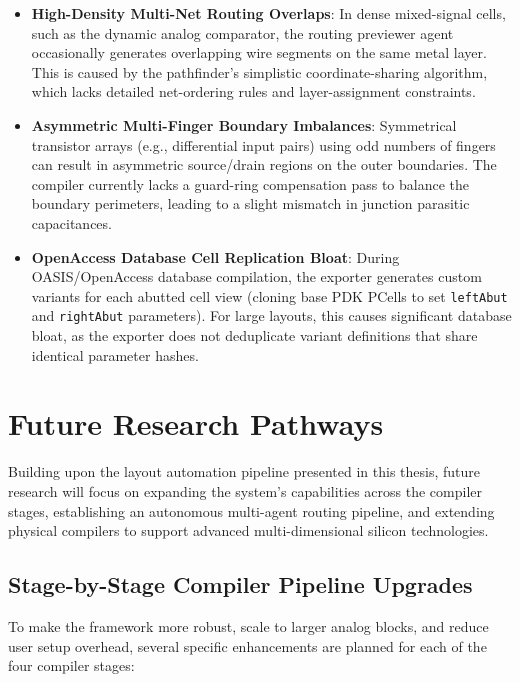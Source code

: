 \begin{itemize}
    \item \textbf{High-Density Multi-Net Routing Overlaps}: In dense mixed-signal cells, such as the dynamic analog comparator, the routing previewer agent occasionally generates overlapping wire segments on the same metal layer. This is caused by the pathfinder's simplistic coordinate-sharing algorithm, which lacks detailed net-ordering rules and layer-assignment constraints.
    \item \textbf{Asymmetric Multi-Finger Boundary Imbalances}: Symmetrical transistor arrays (e.g., differential input pairs) using odd numbers of fingers can result in asymmetric source/drain regions on the outer boundaries. The compiler currently lacks a guard-ring compensation pass to balance the boundary perimeters, leading to a slight mismatch in junction parasitic capacitances.
    \item \textbf{OpenAccess Database Cell Replication Bloat}: During OASIS/OpenAccess database compilation, the exporter generates custom variants for each abutted cell view (cloning base PDK PCells to set \texttt{leftAbut} and \texttt{rightAbut} parameters). For large layouts, this causes significant database bloat, as the exporter does not deduplicate variant definitions that share identical parameter hashes.
\end{itemize}

\section[Future Work]{Future Research Pathways}
\label{sec:future_work}

\noindent
Building upon the layout automation pipeline presented in this thesis, future research will focus on expanding the system's capabilities across the compiler stages, establishing an autonomous multi-agent routing pipeline, and extending physical compilers to support advanced multi-dimensional silicon technologies.

\subsection{Stage-by-Stage Compiler Pipeline Upgrades}
\noindent
To make the framework more robust, scale to larger analog blocks, and reduce user setup overhead, several specific enhancements are planned for each of the four compiler stages:

